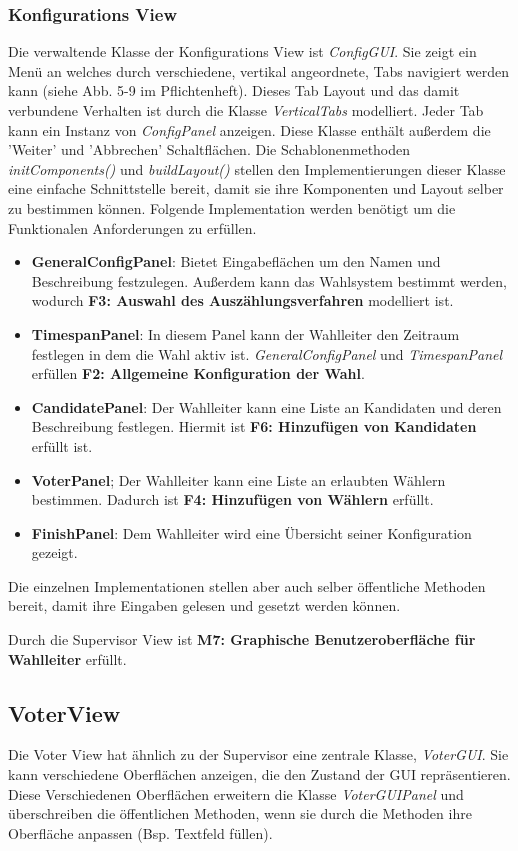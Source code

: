 \documentclass[parskip=full]{scrartcl}
\newcommand{\textitx}[1]{\mbox{\textit{#1}}}
\newcommand{\fakeparagraph}[1]{\textbf{#1}}
\begin{document}
		\subsubsection{Konfigurations View}
		Die verwaltende Klasse der Konfigurations View ist \textitx{ConfigGUI}. Sie zeigt ein Menü an welches durch verschiedene, vertikal angeordnete, Tabs navigiert werden kann (siehe Abb. 5-9 im Pflichtenheft). Dieses Tab Layout und das damit verbundene Verhalten ist durch die Klasse \textitx{VerticalTabs} modelliert. Jeder Tab kann ein Instanz von \textitx{ConfigPanel} anzeigen. Diese Klasse enthält außerdem die 'Weiter' und 'Abbrechen' Schaltflächen. Die Schablonenmethoden \textitx{initComponents()} und \textitx{buildLayout()} stellen den Implementierungen dieser Klasse eine einfache Schnittstelle bereit, damit sie ihre Komponenten und Layout selber zu bestimmen können. 
		Folgende Implementation werden benötigt um die Funktionalen Anforderungen zu erfüllen.
		\begin{itemize}
			\item\fakeparagraph{GeneralConfigPanel}: Bietet Eingabeflächen um den Namen und Beschreibung festzulegen. Außerdem kann das Wahlsystem bestimmt werden, wodurch \textbf{F3: Auswahl des Auszählungsverfahren} modelliert ist.
			\item\fakeparagraph{TimespanPanel}: In diesem Panel kann der Wahlleiter den Zeitraum festlegen in dem die Wahl aktiv ist. \textitx{GeneralConfigPanel} und \textitx{TimespanPanel} erfüllen \textbf{F2: Allgemeine Konfiguration der Wahl}.
			\item\fakeparagraph{CandidatePanel}: Der Wahlleiter kann eine Liste an Kandidaten und deren Beschreibung festlegen. Hiermit ist \textbf{F6: Hinzufügen von Kandidaten} erfüllt ist.
			\item\fakeparagraph{VoterPanel}; Der Wahlleiter kann eine Liste an erlaubten Wählern bestimmen. Dadurch ist \textbf{F4: Hinzufügen von Wählern} erfüllt.
			\item\fakeparagraph{FinishPanel}: Dem Wahlleiter wird eine Übersicht seiner Konfiguration gezeigt. 
		\end{itemize}
		Die einzelnen Implementationen stellen aber auch selber öffentliche Methoden bereit, damit ihre Eingaben gelesen und gesetzt 
		werden können.
		
		Durch die Supervisor View ist \textbf{M7: Graphische Benutzeroberfläche für Wahlleiter} erfüllt.
		
		\subsection{VoterView}
		Die Voter View hat ähnlich zu der Supervisor eine zentrale Klasse, \textitx{VoterGUI}. Sie kann verschiedene Oberflächen anzeigen, die den Zustand der GUI repräsentieren. Diese Verschiedenen Oberflächen erweitern die Klasse \textitx{VoterGUIPanel} und überschreiben die öffentlichen Methoden, wenn sie durch die Methoden ihre Oberfläche anpassen (Bsp. Textfeld füllen).
		
\end{document}
